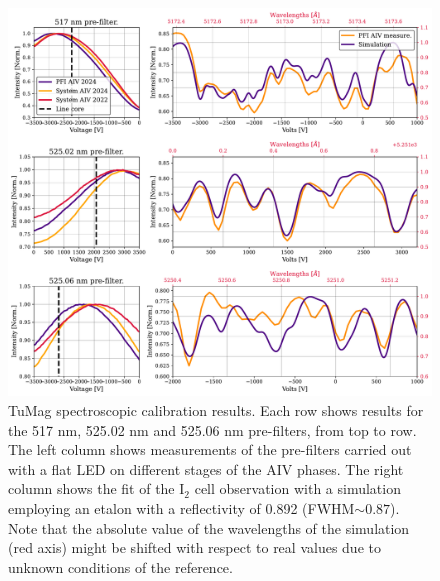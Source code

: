 \begin{figure}
    \includegraphics[width=\textwidth]{figures/TuMag/Spectroscopic_calibration.pdf}
    \caption[TuMag's spectral calibration]{
      TuMag spectroscopic calibration results. Each row shows results for the 517 nm, 525.02 nm and 525.06 nm pre-filters, from top to row. The left column shows measurements of the pre-filters carried out with a flat LED on different stages of the AIV phases. The right column shows the fit of the I$_2$ cell observation with a simulation employing an etalon with a reflectivity of 0.892 (FWHM$\sim 0.87$). Note that the absolute value of the wavelengths of the simulation (red axis) might be shifted with respect to real values due to unknown conditions of the reference.   
      \label{fig_tumag: spectroscopic_results}}
\end{figure}

